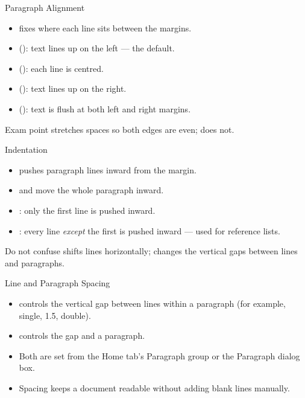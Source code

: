 \documentclass[aspectratio=169]{beamer}
\begin{document}
\begin{frame}{Paragraph Alignment}
  \begin{itemize}
    \item {} fixes where each line sits between the margins.
    \item {} (): text lines up on the left --- the
      default.
    \item {} (): each line is centred.
    \item {} (): text lines up on the right.
    \item {} (): text is flush at both left and right
      margins.
  \end{itemize}
  \begin{alertblock}{Exam point}
     stretches spaces so both edges are even;  does
    not.
  \end{alertblock}
\end{frame}

\begin{frame}{Indentation}
  \begin{itemize}
    \item {} pushes paragraph lines inward from the margin.
    \item {} and  move the whole paragraph
      inward.
    \item {}: only the first line is pushed inward.
    \item {}: every line \emph{except} the first is pushed
      inward --- used for reference lists.
  \end{itemize}
  \begin{block}{Do not confuse}
     shifts lines horizontally;  changes the
    vertical gaps between lines and paragraphs.
  \end{block}
\end{frame}

\begin{frame}{Line and Paragraph Spacing}
  \begin{itemize}
    \item {} controls the vertical gap between lines within a
      paragraph (for example, single, 1.5, double).
    \item {} controls the gap  and
       a paragraph.
    \item Both are set from the Home tab's Paragraph group or the Paragraph
      dialog box.
    \item Spacing keeps a document readable without adding blank lines
      manually.
  \end{itemize}
\end{frame}
\end{document}
